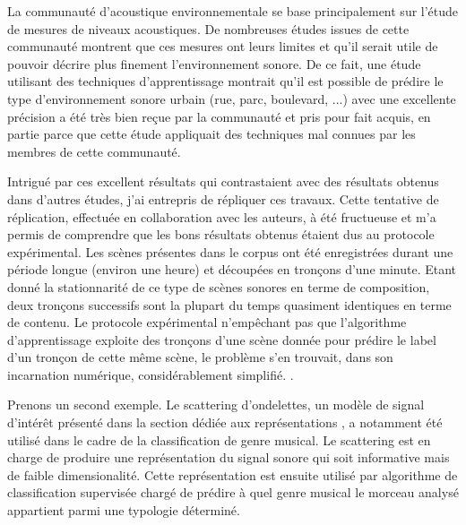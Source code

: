   La communauté d'acoustique environnementale se base principalement sur l'étude de mesures de niveaux acoustiques. De nombreuses études issues de cette communauté montrent que ces mesures ont leurs limites\cite{lavandier2006contribution} et qu'il serait utile de pouvoir décrire plus finement l'environnement sonore. De ce fait, une étude utilisant des techniques d'apprentissage montrait qu'il est possible de prédire le type d'environnement sonore urbain (rue, parc, boulevard, ...) avec une excellente précision\cite{aucouturier2007bag} a été très bien reçue par la communauté et pris pour fait acquis, en partie parce que cette étude appliquait des techniques mal connues par les membres de cette communauté.

  Intrigué par ces excellent résultats qui contrastaient avec des résultats obtenus dans d'autres études, j'ai entrepris de répliquer ces travaux. Cette tentative de réplication, effectuée en collaboration avec les auteurs, à été fructueuse et m'a permis de comprendre que les bons résultats obtenus étaient dus au protocole expérimental\cite{lagrange2015}. Les scènes présentes dans le corpus ont été enregistrées durant une période longue (environ une heure) et découpées en tronçons d'une minute. Etant donné la stationnarité de ce type de scènes sonores en terme de composition, deux tronçons successifs sont la plupart du temps quasiment identiques en terme de contenu. Le protocole expérimental n'empêchant pas que l'algorithme d'apprentissage exploite des tronçons d'une scène donnée pour prédire le label d'un tronçon de cette même scène, le problème s'en trouvait, dans son incarnation numérique, considérablement simplifié. .

  Prenons un second exemple. Le scattering d'ondelettes, un modèle de signal d'intérêt présenté dans la section dédiée aux représentations , a notamment été utilisé dans le cadre de la classification de genre musical\cite{anden2014deep}. Le scattering est en charge de produire une représentation du signal sonore qui soit informative mais de faible dimensionalité. Cette représentation est ensuite utilisé par algorithme de classification supervisée chargé de prédire à quel genre musical le morceau analysé appartient parmi une typologie déterminé.

